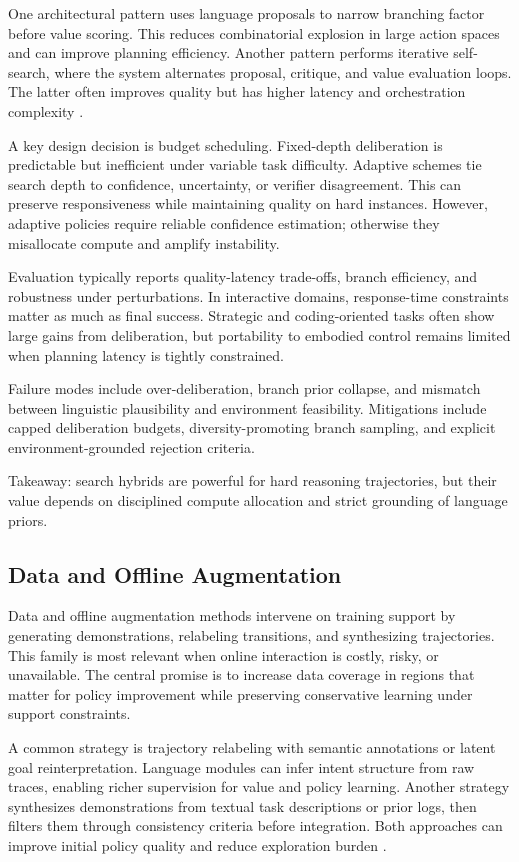 \documentclass[pdflatex,sn-mathphys-num]{sn-jnl}
\begin{document}
One architectural pattern uses language proposals to narrow branching factor before value scoring. This reduces combinatorial explosion in large action spaces and can improve planning efficiency. Another pattern performs iterative self-search, where the system alternates proposal, critique, and value evaluation loops. The latter often improves quality but has higher latency and orchestration complexity \cite{arxiv_p_2602_07848,doi_p_10_48448_q4pk_2g71,doi_p_10_48448_0js4_fm43,arxiv_p_2508_13514}.

A key design decision is budget scheduling. Fixed-depth deliberation is predictable but inefficient under variable task difficulty. Adaptive schemes tie search depth to confidence, uncertainty, or verifier disagreement. This can preserve responsiveness while maintaining quality on hard instances. However, adaptive policies require reliable confidence estimation; otherwise they misallocate compute and amplify instability.

Evaluation typically reports quality-latency trade-offs, branch efficiency, and robustness under perturbations. In interactive domains, response-time constraints matter as much as final success. Strategic and coding-oriented tasks often show large gains from deliberation, but portability to embodied control remains limited when planning latency is tightly constrained.

Failure modes include over-deliberation, branch prior collapse, and mismatch between linguistic plausibility and environment feasibility. Mitigations include capped deliberation budgets, diversity-promoting branch sampling, and explicit environment-grounded rejection criteria.

Takeaway: search hybrids are powerful for hard reasoning trajectories, but their value depends on disciplined compute allocation and strict grounding of language priors.

\subsection{Data and Offline Augmentation}
Data and offline augmentation methods intervene on training support by generating demonstrations, relabeling transitions, and synthesizing trajectories. This family is most relevant when online interaction is costly, risky, or unavailable. The central promise is to increase data coverage in regions that matter for policy improvement while preserving conservative learning under support constraints.

A common strategy is trajectory relabeling with semantic annotations or latent goal reinterpretation. Language modules can infer intent structure from raw traces, enabling richer supervision for value and policy learning. Another strategy synthesizes demonstrations from textual task descriptions or prior logs, then filters them through consistency criteria before integration. Both approaches can improve initial policy quality and reduce exploration burden \cite{arxiv_p_2310_20587,arxiv_p_2601_08107,arxiv_p_2602_14468,arxiv_p_2202_05607}.
\end{document}
